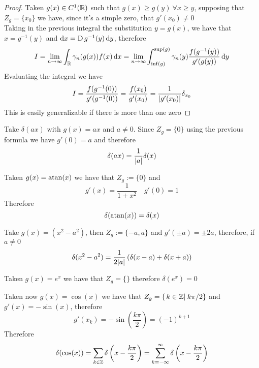 \documentclass[../complete.tex]{subfiles}
\begin{document}
\begin{proof}
	Taken $g(x)\in C^1(\mathbb{R})$ such that $g(x)\ge g(y)\ \forall x\ge y$, supposing that $Z_g=\{x_0\}$ we have, since it's a simple zero, that $g'(x_0)\ne0$\\
	Taking in the previous integral the substitution $y=g(x)$, we have that $x=g^{-1}(y)$ and $\operatorname{d\!} x=\operatorname{\mathrm{D}} g^{-1}(y)\operatorname{d\!} y$, therefore
	\begin{equation*}
		I=\lim_{n\to\infty}\int_{\mathbb{R}}^{}\gamma_n(g(x))f(x)\operatorname{d\!} x=\lim_{n\to\infty}\int_{\inf(g)}^{\sup(g)}\gamma_n(y)\frac{f(g^{-1}(y))}{g'(g(y))}\operatorname{d\!} y
	\end{equation*}
	Evaluating the integral we have
	\begin{equation*}
		I=\frac{f(g^{-1}(0))}{g'(g^{-1}(0))}=\frac{f(x_0)}{g'(x_0)}=\frac{1}{\abs{g'(x_0)}}\delta_{x_0}
	\end{equation*}
	This is easily generalizable if there is more than one zero
\end{proof}
\begin{eg}
	Take $\delta(ax)$ with $g(x)=ax$ and $a\ne0$. Since $Z_g=\{0\}$ using the previous formula we have $g'(0)=a$ and therefore
	\begin{equation*}
		\delta(ax)=\frac{1}{\abs{a}}\delta(x)
	\end{equation*}
\end{eg}
\begin{eg}
	Taken $g(x)=\atan(x)$ we have that $Z_g:=\{0\}$ and
	\begin{equation*}
		g'(x)=\frac{1}{1+x^2}\quad g'(0)=1
	\end{equation*}
	Therefore
	\begin{equation*}
		\delta(\atan(x))=\delta(x)
	\end{equation*}
\end{eg}
\begin{eg}
	Take $g(x)=(x^2-a^2)$, then $Z_g:=\{-a,a\}$ and $g'(\pm a)=\pm2a$, therefore, if $a\ne0$
	\begin{equation*}
		\delta(x^2-a^2)=\frac{1}{2\abs{a}}\left(\delta(x-a)+\delta(x+a)\right)
	\end{equation*}
\end{eg}
\begin{eg}
	Taken $g(x)=e^x$ we have that $Z_g=\{\}$ therefore $\delta(e^x)=0$
\end{eg}
\begin{eg}
	Taken now $g(x)=\cos(x)$ we have that $Z_g=\left\{ \left.k\in\mathbb{Z}\right|_{} k\pi/2 \right\}$ and $g'(x)=-\sin(x)$, therefore
	\begin{equation*}
		g'(x_k)=-\sin(\frac{k\pi}{2})=(-1)^{k+1}
	\end{equation*}
	Therefore
	\begin{equation*}
		\delta(\cos(x))=\sum_{k\in\mathbb{Z}}\delta\left(x-\frac{k\pi}{2}\right)=\sum_{k=-\infty}^{\infty}\delta\left( x-\frac{k\pi}{2} \right)
	\end{equation*}
\end{eg}
\end{document}
